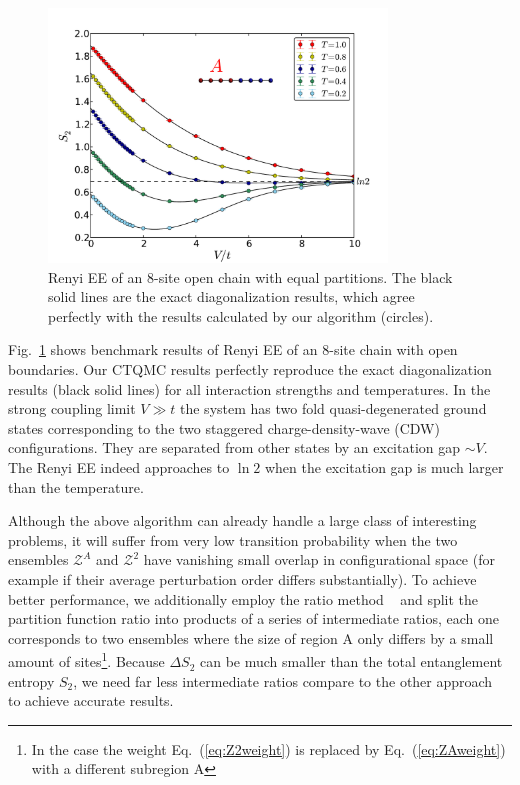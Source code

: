 \documentclass[12pt,onecolumn,english,prl,showpacs,nofootinbib]{revtex4-1}
\begin{document}
\begin{figure}[t]
\centering
\includegraphics[width=9cm]{benchmark.pdf}
\caption{Renyi EE of an $8$-site open chain with equal partitions. The black solid lines are the exact diagonalization results, which agree perfectly with the results calculated by our algorithm (circles).}
\label{fig:1dbenchmark}
\end{figure}


Fig.~\ref{fig:1dbenchmark} shows benchmark results of Renyi EE of an $8$-site chain with open boundaries. Our CTQMC results perfectly reproduce the exact diagonalization results (black solid lines) for all interaction strengths and temperatures. In the strong coupling limit $V\gg t $ the system has two fold quasi-degenerated ground states corresponding to the two staggered charge-density-wave (CDW) configurations. They are separated from other states by an excitation gap $\sim V$. The Renyi EE indeed approaches to $\ln 2$ when the excitation gap is much larger than the temperature.  
  

Although the above algorithm can already handle a large class of interesting problems, it will suffer from very low transition probability when the two ensembles $\mathcal{Z}^{A}$ and $\mathcal{Z}^{2}$ have vanishing small overlap in configurational space (for example if their average perturbation order differs substantially). To achieve better performance, we additionally employ the ratio method ~\cite{Hastings:2010dca, Humeniuk:2012cq} and split the partition function ratio into products of a series of intermediate ratios, each one corresponds to two ensembles where the size of region A only differs by a small amount of sites\footnote{In the case the weight Eq.~(\ref{eq:Z2weight}) is replaced by Eq.~(\ref{eq:ZAweight}) with a different subregion A}. Because $\Delta S_{2}$ can be much smaller than  the total entanglement entropy $S_{2}$, we need far less intermediate ratios compare to the other approach~\cite{Broecker:2014ud} to achieve accurate results. 
\end{document}
